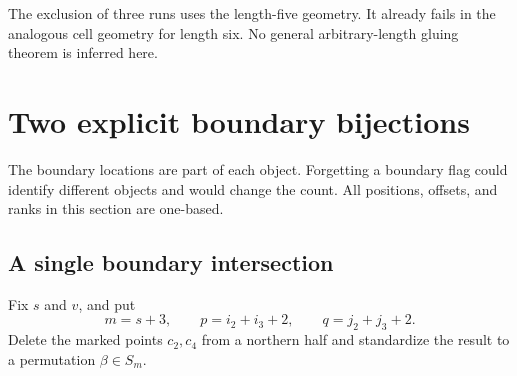 \documentclass[11pt,letterpaper]{article}
\theoremstyle{remark}\newtheorem{remark}[theorem]{Remark}
\numberwithin{equation}{section}
\begin{document}
The exclusion of three runs uses the length-five geometry. It already
fails in the analogous cell geometry for length six. No general
arbitrary-length gluing theorem is inferred here.

\section{Two explicit boundary bijections}\label{upo:ex5:sec:boundary}
The boundary locations are part of each object. Forgetting a boundary
flag could identify different objects and would change the count.
All positions, offsets, and ranks in this section are one-based.

\subsection{A single boundary intersection}
Fix $s$ and $v$, and put
\[
 m=s+3,\qquad p=i_2+i_3+2,\qquad q=j_2+j_3+2.
\]
Delete the marked points $c_2,c_4$ from a northern half and standardize
the result to a permutation $\beta\in S_m$.
\end{document}
